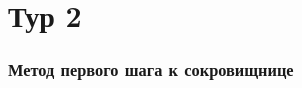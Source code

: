 \documentclass[a4paper,12pt]{article}
\begin{document}
\newpage





\part{Тур 2}



\section{Метод первого шага к сокровищнице} %
\end{document}
